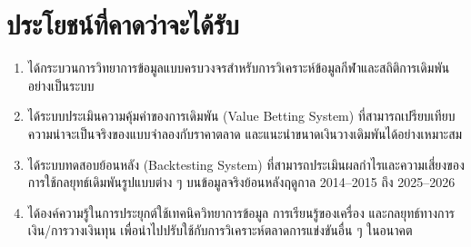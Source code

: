 \section{ประโยชน์ที่คาดว่าจะได้รับ}

\begin{enumerate}[label=\arabic*)]
    \item ได้กระบวนการวิทยาการข้อมูลแบบครบวงจรสำหรับการวิเคราะห์ข้อมูลกีฬาและสถิติการเดิมพันอย่างเป็นระบบ
    \item ได้ระบบประเมินความคุ้มค่าของการเดิมพัน (Value Betting System) ที่สามารถเปรียบเทียบความน่าจะเป็นจริงของแบบจำลองกับราคาตลาด และแนะนำขนาดเงินวางเดิมพันได้อย่างเหมาะสม
    \item ได้ระบบทดสอบย้อนหลัง (Backtesting System) ที่สามารถประเมินผลกำไรและความเสี่ยงของการใช้กลยุทธ์เดิมพันรูปแบบต่าง ๆ บนข้อมูลจริงย้อนหลังฤดูกาล 2014--2015 ถึง 2025--2026
    \item ได้องค์ความรู้ในการประยุกต์ใช้เทคนิควิทยาการข้อมูล การเรียนรู้ของเครื่อง และกลยุทธ์ทางการเงิน/การวางเงินทุน เพื่อนำไปปรับใช้กับการวิเคราะห์ตลาดการแข่งขันอื่น ๆ ในอนาคต
\end{enumerate}